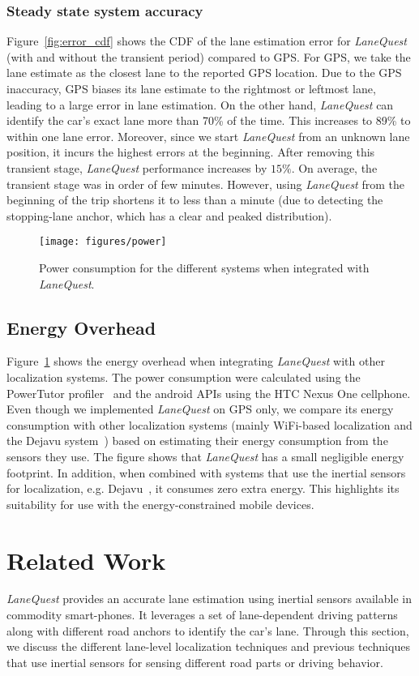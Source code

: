 \documentclass[10pt, conference, compsocconf]{IEEEtran}
\def \sys {\textit{LaneQuest}}
\newcommand{\figscale}{0.7}
\begin{document}
\subsubsection{Steady state system accuracy}
Figure~\ref{fig:error_cdf} shows the CDF of the lane estimation error for \sys{} (with and without the transient period) compared to GPS. For GPS, we take the lane estimate as the closest lane to the reported GPS location. Due to the GPS inaccuracy, GPS biases its lane estimate to the rightmost or leftmost lane, leading to a large error in lane estimation. On the other hand, \sys{} can identify the car's exact lane more than 70\% of the time. This increases to 89\% to within one lane error. Moreover, since we start \sys{} from an unknown lane position, it incurs the highest errors at the beginning. After removing this transient stage, \sys{} performance increases by $15\%$.  On average, the transient stage was in order of few minutes. However, using \sys{} from the beginning of the trip shortens it  to less than a minute (due to detecting the stopping-lane anchor, which has a clear and peaked distribution).
\begin{figure}[!t]
\centering
\texttt{[image: figures/power]}
\caption{Power consumption for the different systems when integrated with \sys{}.}
\label{fig:power}
\end{figure}
\subsection{Energy Overhead}
Figure~\ref{fig:power} shows the energy overhead when integrating \sys{} with other localization systems. The power consumption were calculated using the PowerTutor profiler~\cite{zhang2010accurate} and the android APIs using the HTC Nexus One cellphone. Even though we implemented \sys{} on GPS only, we compare its energy consumption with other localization systems (mainly WiFi-based localization and the Dejavu system~\cite{aly2013dejavu}) based on estimating their energy consumption from the sensors they use. The figure shows that \sys{} has a small negligible energy footprint. In addition, when combined with systems that use the inertial sensors for localization, e.g. Dejavu~\cite{aly2013dejavu}, it consumes zero extra energy. This highlights its suitability for use with the energy-constrained mobile devices.
\section{Related Work}\label{sec:relwork}\sys{} provides an accurate lane estimation using inertial sensors available in commodity smart-phones. It leverages a set of lane-dependent driving patterns along with different road anchors to identify the car's lane. Through this section, we discuss the different lane-level localization techniques and previous techniques that use inertial sensors for sensing different road parts or driving behavior.
\end{document}
